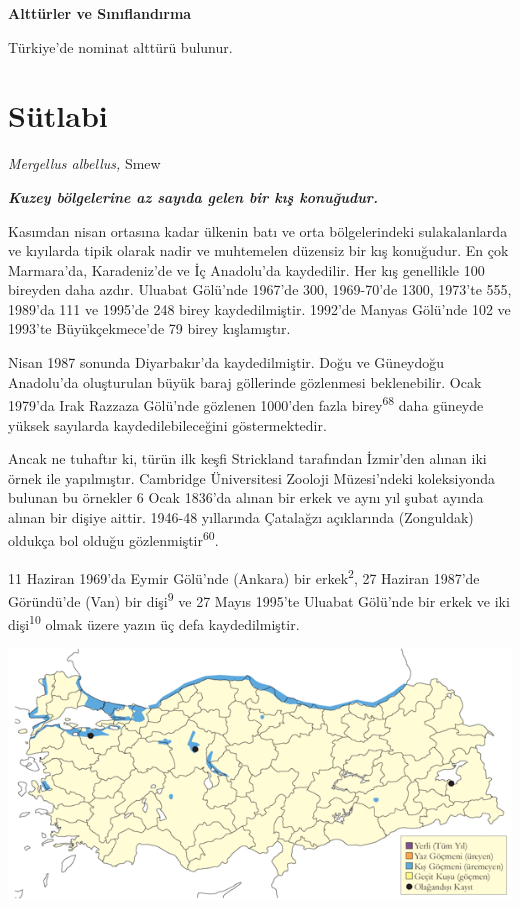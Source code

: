 \documentclass[
  letterpaper,
  DIV=11,
  numbers=noendperiod]{scrreprt}
\begin{document}
\textbf{Alttürler ve Sınıflandırma}

Türkiye'de nominat alttürü bulunur.

\hypertarget{suxfctlabi}{%
\section{Sütlabi}\label{suxfctlabi}}

\emph{Mergellus albellus,} Smew

\textbf{\emph{Kuzey bölgelerine az sayıda gelen bir kış konuğudur.}}

Kasımdan nisan ortasına kadar ülkenin batı ve orta bölgelerindeki
sulakalanlarda ve kıyılarda tipik olarak nadir ve muhtemelen düzensiz
bir kış konuğudur. En çok Marmara'da, Karadeniz'de ve İç Anadolu'da
kaydedilir. Her kış genellikle 100 bireyden daha azdır. Uluabat Gölü'nde
1967'de 300, 1969-70'de 1300, 1973'te 555, 1989'da 111 ve 1995'de 248
birey kaydedilmiştir. 1992'de Manyas Gölü'nde 102 ve 1993'te
Büyükçekmece'de 79 birey kışlamıştır.

Nisan 1987 sonunda Diyarbakır'da kaydedilmiştir. Doğu ve Güneydoğu
Anadolu'da oluşturulan büyük baraj göllerinde gözlenmesi beklenebilir.
Ocak 1979'da Irak Razzaza Gölü'nde gözlenen 1000'den fazla
birey\textsuperscript{68} daha güneyde yüksek sayılarda
kaydedilebileceğini göstermektedir.

Ancak ne tuhaftır ki, türün ilk keşfi Strickland tarafından İzmir'den
alınan iki örnek ile yapılmıştır. Cambridge Üniversitesi Zooloji
Müzesi'ndeki koleksiyonda bulunan bu örnekler 6 Ocak 1836'da alınan bir
erkek ve aynı yıl şubat ayında alınan bir dişiye aittir. 1946-48
yıllarında Çatalağzı açıklarında (Zonguldak) oldukça bol olduğu
gözlenmiştir\textsuperscript{60}.

11 Haziran 1969'da Eymir Gölü'nde (Ankara) bir erkek\textsuperscript{2},
27 Haziran 1987'de Göründü'de (Van) bir dişi\textsuperscript{9} ve 27
Mayıs 1995'te Uluabat Gölü'nde bir erkek ve iki dişi\textsuperscript{10}
olmak üzere yazın üç defa kaydedilmiştir.

\includegraphics{images/harita_Page_032.png}
\end{document}
